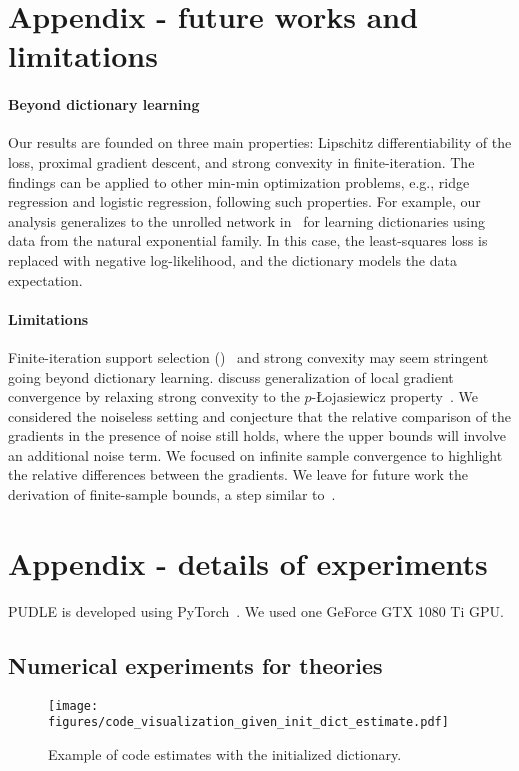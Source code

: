 \documentclass[10pt]{article} %
\begin{document}
\section{Appendix - future works and limitations}\label{lim}
%
\paragraph{Beyond dictionary learning} Our results are founded on three main properties: Lipschitz differentiability of the loss, proximal gradient descent, and strong convexity in finite-iteration. The findings can be applied to other min-min optimization problems, e.g., ridge regression and logistic regression, following such properties. For example, our analysis generalizes to the unrolled network in~\citep{tolooshams2020icml} for learning dictionaries using data from the natural exponential family. In this case, the least-squares loss is replaced with negative log-likelihood, and the dictionary models the data expectation.
%
\paragraph{Limitations} Finite-iteration support selection ()~\citep{hale2007fixed} and strong convexity may seem stringent going beyond dictionary learning. \citet{ablin2020super} discuss generalization of local gradient convergence by relaxing strong convexity to the $p$-\L ojasiewicz property~\citep{ablin2020super,attouch2009convergence}. We considered the noiseless setting and conjecture that the relative comparison of the gradients in the presence of noise still holds, where the upper bounds will involve an additional noise term. We focused on infinite sample convergence to highlight the relative differences between the gradients. We leave for future work the derivation of finite-sample bounds, a step similar to~\citep{chatterji2017alternating, arora2015sparsecoding}.
%

\section{Appendix - details of experiments}\label{exp_app}
%
PUDLE is developed using PyTorch~\citep{paszke2017automatic}. We used one GeForce GTX 1080 Ti GPU.
%
\subsection{Numerical experiments for theories}
%
%
\begin{wrapfigure}[12]{r}{0.33\textwidth}
    \vspace{-6mm}
	\centering
	\texttt{[image: figures/code\_visualization\_given\_init\_dict\_estimate.pdf]}
    \caption{Example of code estimates with the initialized dictionary.}
	\label{fig:code_init}
\end{wrapfigure}
%
\end{document}

